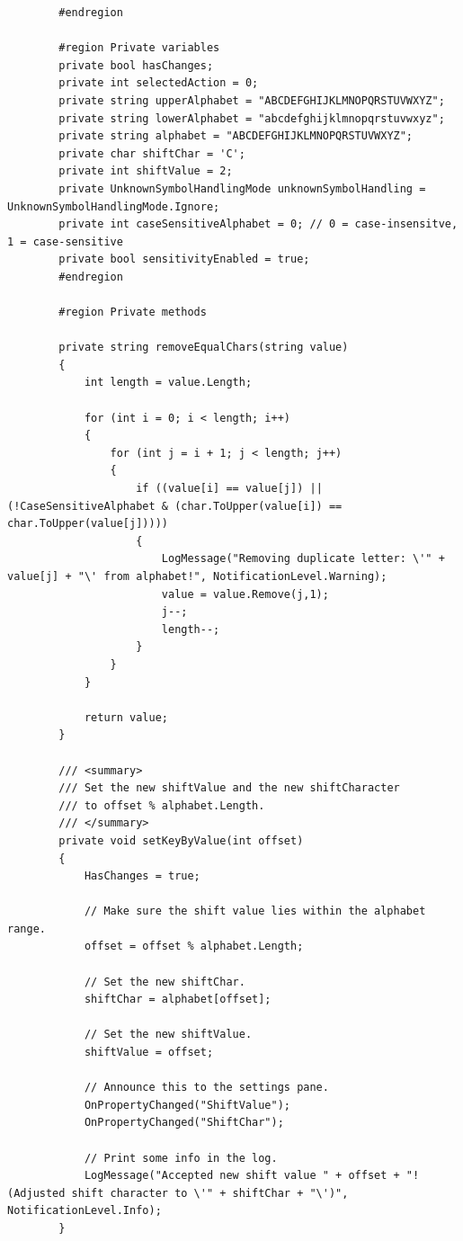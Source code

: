 \begin{lstlisting}
        #endregion

        #region Private variables
        private bool hasChanges;
        private int selectedAction = 0;
        private string upperAlphabet = "ABCDEFGHIJKLMNOPQRSTUVWXYZ";
        private string lowerAlphabet = "abcdefghijklmnopqrstuvwxyz";
        private string alphabet = "ABCDEFGHIJKLMNOPQRSTUVWXYZ";
        private char shiftChar = 'C';
        private int shiftValue = 2;
        private UnknownSymbolHandlingMode unknownSymbolHandling = UnknownSymbolHandlingMode.Ignore;
        private int caseSensitiveAlphabet = 0; // 0 = case-insensitve, 1 = case-sensitive
        private bool sensitivityEnabled = true;
        #endregion

        #region Private methods

        private string removeEqualChars(string value)
        {
            int length = value.Length;

            for (int i = 0; i < length; i++)
            {
                for (int j = i + 1; j < length; j++)
                {
                    if ((value[i] == value[j]) || (!CaseSensitiveAlphabet & (char.ToUpper(value[i]) == char.ToUpper(value[j]))))
                    {
                        LogMessage("Removing duplicate letter: \'" + value[j] + "\' from alphabet!", NotificationLevel.Warning);
                        value = value.Remove(j,1);
                        j--;
                        length--;
                    }
                }
            }

            return value;
        }

        /// <summary>
        /// Set the new shiftValue and the new shiftCharacter
        /// to offset % alphabet.Length.
        /// </summary>
        private void setKeyByValue(int offset)
        {
            HasChanges = true;

            // Make sure the shift value lies within the alphabet range.
            offset = offset % alphabet.Length;

            // Set the new shiftChar.
            shiftChar = alphabet[offset];

            // Set the new shiftValue.
            shiftValue = offset;

            // Announce this to the settings pane.
            OnPropertyChanged("ShiftValue");
            OnPropertyChanged("ShiftChar");

            // Print some info in the log.
            LogMessage("Accepted new shift value " + offset + "! (Adjusted shift character to \'" + shiftChar + "\')", NotificationLevel.Info);
        }


\end{lstlisting}
